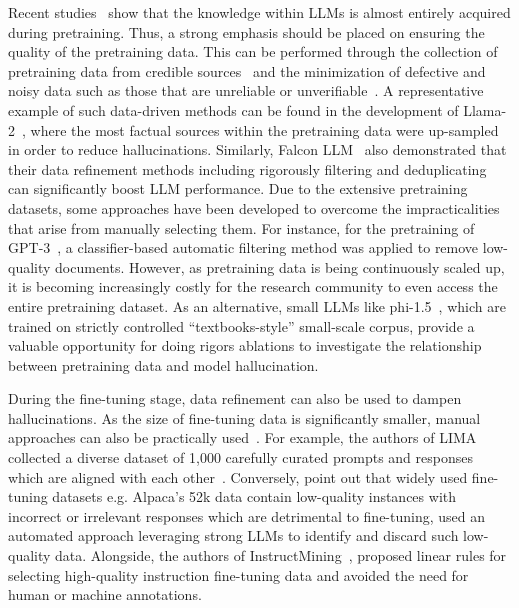 \label{sec:llm:method:data}

Recent studies~ show that the knowledge within LLMs is almost entirely acquired during pretraining. Thus, a strong emphasis should be placed on ensuring the quality of the pretraining data. This can be performed through the collection of pretraining data from credible sources~ and the minimization of defective and noisy data such as those that are unreliable or unverifiable~. A representative example of such data-driven methods can be found in the development of Llama-2~, where the most factual sources within the pretraining data were up-sampled in order to reduce hallucinations. Similarly, Falcon LLM~ also demonstrated that their data refinement methods including rigorously filtering and deduplicating can significantly boost LLM performance.  Due to the extensive pretraining datasets, some approaches have been developed to overcome the impracticalities that arise from manually selecting them. For instance, for the pretraining of GPT-3~, a classifier-based automatic filtering method was applied to remove low-quality documents. However, as pretraining data is being continuously scaled up, it is becoming increasingly costly for the research community to even access the entire pretraining dataset. As an alternative, small LLMs like phi-1.5~, which are trained on strictly controlled ``textbooks-style'' small-scale corpus, provide a valuable opportunity for doing rigors ablations to investigate the relationship between pretraining data and model hallucination.

During the fine-tuning stage, data refinement can also be used to dampen hallucinations. As the size of fine-tuning data is significantly smaller, manual approaches can also be practically used~. For example, the authors of LIMA collected a diverse dataset of 1,000 carefully curated prompts and responses which are aligned with each other~. Conversely,  point out that widely used fine-tuning datasets e.g. Alpaca’s 52k data contain low-quality instances with incorrect or irrelevant responses which are detrimental to fine-tuning, used an automated approach leveraging strong LLMs to identify and discard such low-quality data. Alongside, the authors of InstructMining~, proposed linear rules for selecting high-quality instruction fine-tuning data and avoided the need for human or machine annotations.

